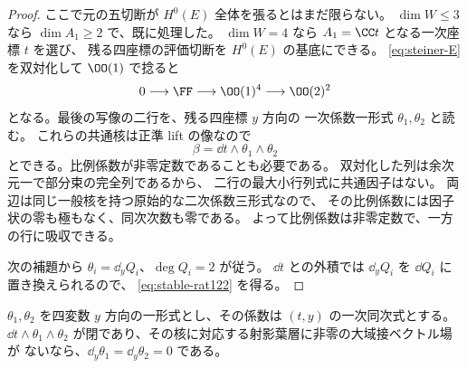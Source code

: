 \begin{proof}
ここで元の五切断が $H^0(E)$ 全体を張るとはまだ限らない。
$\dim W\leq3$ なら $\dim A_1\geq2$ で、既に処理した。
$\dim W=4$ なら $A_1=\CC t$ となる一次座標 $t$ を選び、
残る四座標の評価切断を $H^0(E)$ の基底にできる。
\eqref{eq:steiner-E} を双対化して $\OO(1)$ で捻ると
\[
 0\longrightarrow\FF\longrightarrow\OO(1)^4
 \longrightarrow\OO(2)^2
\]
となる。最後の写像の二行を、残る四座標 $y$ 方向の
一次係数一形式 $\theta_1,\theta_2$ と読む。
これらの共通核は正準 lift の像なので
\begin{equation}
 \beta=\dd t\wedge\theta_1\wedge\theta_2
 \label{eq:steiner-beta}
\end{equation}
とできる。比例係数が非零定数であることも必要である。
双対化した列は余次元一で部分束の完全列であるから、
二行の最大小行列式に共通因子はない。
両辺は同じ一般核を持つ原始的な二次係数三形式なので、
その比例係数には因子状の零も極もなく、同次次数も零である。
よって比例係数は非零定数で、一方の行に吸収できる。

次の補題から $\theta_i=\dd_y Q_i$、$\deg Q_i=2$ が従う。
$\dd t$ との外積では $\dd_y Q_i$ を $\dd Q_i$ に置き換えられるので、
\eqref{eq:stable-rat122} を得る。
\end{proof}

\begin{lemma}[閉な二つの一次係数一形式]
\label{lem:closed-linear-oneforms}
$\theta_1,\theta_2$ を四変数 $y$ 方向の一形式とし、その係数は
$(t,y)$ の一次同次式とする。$\dd t\wedge\theta_1\wedge\theta_2$
が閉であり、その核に対応する射影葉層に非零の大域接ベクトル場が
ないなら、$\dd_y\theta_1=\dd_y\theta_2=0$ である。
\end{lemma}

